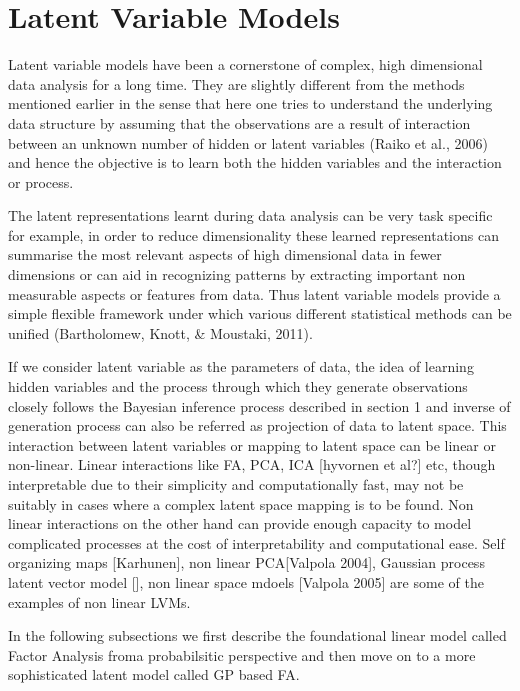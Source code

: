 \section{Latent Variable Models}

\thispagestyle{empty}
Latent variable models have been a cornerstone of complex, high dimensional data analysis for a long time. They are slightly different from the methods mentioned earlier in the sense that here one tries to understand the underlying data structure by assuming that the observations are a result of interaction between an unknown number of hidden or latent variables (Raiko et al., 2006) and hence the objective is to learn both the hidden variables and the interaction or process.

The latent representations learnt during data analysis can be very task specific for example, in order to reduce dimensionality these learned representations can summarise the most relevant aspects of high dimensional data in fewer dimensions or can aid in recognizing patterns by extracting important non measurable aspects or features from data. Thus latent variable models provide a simple flexible framework under which various different statistical methods can be unified (Bartholomew, Knott, & Moustaki, 2011).  

If we consider latent variable as the parameters of data, the idea of learning hidden variables and the process through which they generate observations closely follows the Bayesian inference process described in section 1 and inverse of generation process can also be referred as projection of data to latent space. This interaction between latent variables or mapping to latent space can be linear or non-linear. Linear interactions like FA, PCA, ICA [hyvornen et al?] etc, though interpretable due to their simplicity and computationally fast, may not be suitably in cases where a complex latent space mapping is to be found. Non linear interactions on the other hand can provide enough capacity to model complicated processes at the cost of interpretability and computational ease. Self organizing maps [Karhunen], non linear PCA[Valpola 2004], Gaussian process latent vector model [], non linear space mdoels [Valpola 2005] are some of the examples of non linear LVMs.

In the following subsections we first describe the foundational linear model called Factor Analysis froma probabilsitic perspective and then move on to a more sophisticated latent model called GP based FA. 


